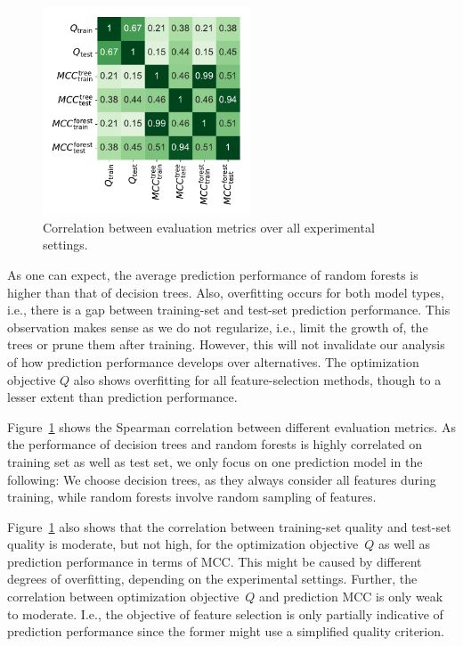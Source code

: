 \documentclass{article}
\theoremstyle{definition}
\begin{document}
\begin{figure}[htb]
	\centering
	\includegraphics[width=0.55\textwidth, trim=15 15 15 15, clip]{plots/evaluation-metrics-correlation.pdf}
	\caption{Correlation between evaluation metrics over all experimental settings.}
	\label{fig:afs:evaluation-metrics-correlation}
\end{figure}

As one can expect, the average prediction performance of random forests is higher than that of decision trees.
Also, overfitting occurs for both model types, i.e., there is a gap between training-set and test-set prediction performance.
This observation makes sense as we do not regularize, i.e., limit the growth of, the trees or prune them after training.
However, this will not invalidate our analysis of how prediction performance develops over alternatives.
The optimization objective $Q$ also shows overfitting for all feature-selection methods, though to a lesser extent than prediction performance.

Figure~\ref{fig:afs:evaluation-metrics-correlation} shows the Spearman correlation between different evaluation metrics.
As the performance of decision trees and random forests is highly correlated on training set as well as test set, we only focus on one prediction model in the following:
We choose decision trees, as they always consider all features during training, while random forests involve random sampling of features.

Figure~\ref{fig:afs:evaluation-metrics-correlation} also shows that the correlation between training-set quality and test-set quality is moderate, but not high, for the optimization objective~$Q$ as well as prediction performance in terms of MCC.
This might be caused by different degrees of overfitting, depending on the experimental settings.
Further, the correlation between optimization objective~$Q$ and prediction MCC is only weak to moderate.
I.e., the objective of feature selection is only partially indicative of prediction performance since the former might use a simplified quality criterion.
\end{document}
